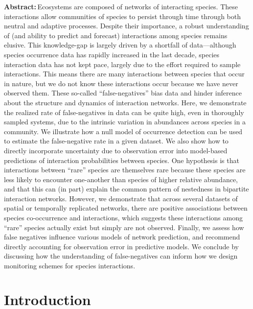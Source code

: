 \documentclass[11pt]{article}
\begin{document}
        {\bfseries Abstract:}\,Ecosystems are composed of networks of
interacting species. These interactions allow communities of species to
persist through time through both neutral and adaptive processes.
Despite their importance, a robust understanding of (and ability to
predict and forecast) interactions among species remains elusive. This
knowledge-gap is largely driven by a shortfall of data---although
species occurrence data has rapidly increased in the last decade,
species interaction data has not kept pace, largely due to the effort
required to sample interactions. This means there are many interactions
between species that occur in nature, but we do not know these
interactions occur because we have never observed them. These so-called
``false-negatives'' bias data and hinder inference about the structure
and dynamics of interaction networks. Here, we demonstrate the realized
rate of false-negatives in data can be quite high, even in thoroughly
sampled systems, due to the intrinsic variation in abundances across
species in a community. We illustrate how a null model of occurrence
detection can be used to estimate the false-negative rate in a given
dataset. We also show how to directly incorporate uncertainty due to
observation error into model-based predictions of interaction
probabilities between species. One hypothesis is that interactions
between ``rare'' species are themselves rare because these species are
less likely to encounter one-another than species of higher relative
abundance, and that this can (in part) explain the common pattern of
nestedness in bipartite interaction networks. However, we demonstrate
that across several datasets of spatial or temporally replicated
networks, there are positive associations between species co-occurrence
and interactions, which suggests these interactions among ``rare''
species actually exist but simply are not observed. Finally, we assess
how false negatives influence various models of network prediction, and
recommend directly accounting for observation error in predictive
models. We conclude by discussing how the understanding of
false-negatives can inform how we design monitoring schemes for species
interactions.\\%
    
\vfill

\clearpage
\linenumbers
\pagestyle{normal}

\hypertarget{introduction}{%
\section{Introduction}\label{introduction}}
\end{document}
